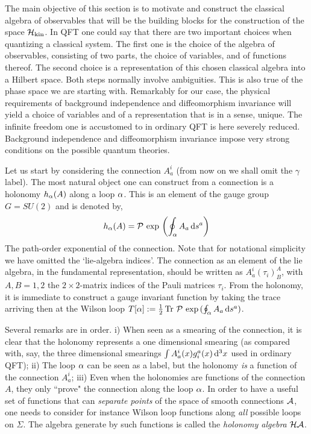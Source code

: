 \documentclass[aps,prd,tightenlines,showpacs,nofootinbib,preprint]{revtex4}
\def\be{\begin{equation}}
\def\ee{\end{equation}}
\def\d{{\rm d}}
\begin{document}
The main objective of this section is to motivate and
construct the classical algebra of observables that will be the
building blocks for the construction of the space ${\cal H}_{\rm
kin}$. In QFT one could say that there are two important choices
when quantizing a classical system. The first one is the choice of
the algebra of observables, consisting of two parts, the choice of
variables, and of functions thereof. The second choice is a
representation of this chosen classical algebra into a Hilbert
space. Both steps normally involve ambiguities. This is also true
of the phase space we are starting with. Remarkably for our case,
the physical requirements of background independence and
diffeomorphism invariance will yield a choice of variables and of
a representation that is in a sense, unique. The infinite freedom
one is accustomed to in ordinary QFT is here severely reduced.
Background independence and diffeomorphism invariance impose very
strong conditions on the possible quantum theories.

Let us start by considering the connection $A_a^i$ (from now on we
shall omit the $\gamma$ label). The most natural object one can
construct from a connection is a holonomy $h_{\alpha}(A)$ along a loop
${\alpha}$. This is an element of the gauge group $G=SU(2)$ and is
denoted by,
%
\be h_\a(A)={\cal P}\,\exp\,\left( \oint_\a A_a\,\d s^a \right)
\ee
%
The path-order exponential of the connection. Note that for
notational simplicity we have omitted the `lie-algebra indices'.
The connection as an element of the lie algebra, in the
fundamental representation, should be written as
$A_a^i(\tau_{{}i})^A_B$, with $A,B=1,2$ the $2\times 2$-matrix
indices of the Pauli matrices $\tau_{{}i}$. From the holonomy, it
is immediate to construct a gauge invariant function by taking the
trace arriving then at the Wilson loop $T[\a] := \frac{1}{2}\,
{\rm Tr}\,\, {\cal P}\,\exp\,(\oint_\a A_a\, \d s^a)$.

Several remarks are in order. i) When seen as a smearing of the
connection, it is clear that the holonomy represents a one
dimensional smearing (as compared with, say, the three dimensional
smearings $\int A_a^i(x)g^a_i(x)\,\d^3 x$ used in ordinary QFT);
ii) The loop ${\alpha}$ can be seen as a label, but the holonomy {\it
is} a function of the connection $A^i_a$; iii) Even when the
holonomies are functions of the connection $A$, they only ``prove"
the connection along the loop ${\alpha}$. In order to have a useful set
of functions that can {\it separate points} of the space of smooth
connections ${\cal A}$, one needs to consider for instance Wilson
loop functions along {\it all} possible loops on $\Sigma$. The
algebra generate by such functions is called the {\it holonomy
algebra} ${\cal HA}$.
\end{document}
